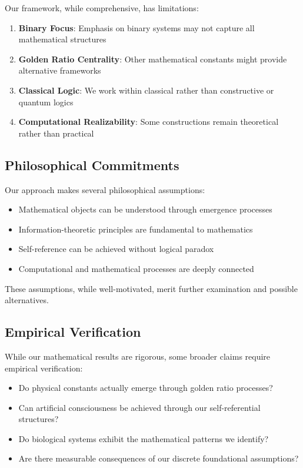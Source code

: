 \documentclass[12pt]{article}
\theoremstyle{plain}
\theoremstyle{definition}
\begin{document}
Our framework, while comprehensive, has limitations:

\begin{enumerate}
\item \textbf{Binary Focus}: Emphasis on binary systems may not capture all mathematical structures
\item \textbf{Golden Ratio Centrality}: Other mathematical constants might provide alternative frameworks
\item \textbf{Classical Logic}: We work within classical rather than constructive or quantum logics
\item \textbf{Computational Realizability}: Some constructions remain theoretical rather than practical
\end{enumerate}

\subsection{Philosophical Commitments}

Our approach makes several philosophical assumptions:

\begin{itemize}
\item Mathematical objects can be understood through emergence processes
\item Information-theoretic principles are fundamental to mathematics
\item Self-reference can be achieved without logical paradox
\item Computational and mathematical processes are deeply connected
\end{itemize}

These assumptions, while well-motivated, merit further examination and possible alternatives.

\subsection{Empirical Verification}

While our mathematical results are rigorous, some broader claims require empirical verification:

\begin{itemize}
\item Do physical constants actually emerge through golden ratio processes?
\item Can artificial consciousness be achieved through our self-referential structures?
\item Do biological systems exhibit the mathematical patterns we identify?
\item Are there measurable consequences of our discrete foundational assumptions?
\end{itemize}
\end{document}
